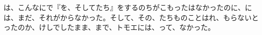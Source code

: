 は、こんなにで『を、そしてたち』をするのちがこもったはなかったのに、には、まだ、それがからなかった。そして、その、たちものことはれ、もらないとったのか、けしでしたまま、まで、トモエには、って、なかった。



